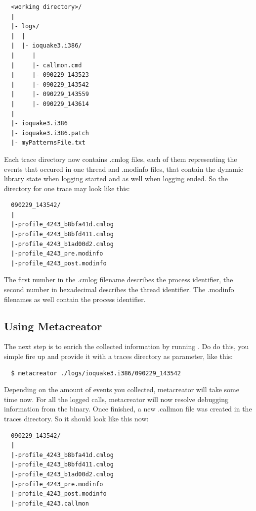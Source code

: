 \begin{verbatim}
  <working directory>/
  |
  |- logs/
  |  |
  |  |- ioquake3.i386/
  |     |
  |     |- callmon.cmd
  |     |- 090229_143523
  |     |- 090229_143542
  |     |- 090229_143559
  |     |- 090229_143614
  |
  |- ioquake3.i386
  |- ioquake3.i386.patch
  |- myPatternsFile.txt
\end{verbatim}

Each trace directory now contains .cmlog files, each of them representing the events that occured in one thread and .modinfo files, that contain the dynamic library state when logging started and as well when logging ended. So the directory for one trace may look like this: 

\begin{verbatim}
  090229_143542/
  |
  |-profile_4243_b8bfa41d.cmlog
  |-profile_4243_b8bfd411.cmlog
  |-profile_4243_b1ad00d2.cmlog
  |-profile_4243_pre.modinfo
  |-profile_4243_post.modinfo
\end{verbatim}

The first number in the .cmlog filename describes the process identifier, the second number in hexadecimal describes the thread identifier. The .modinfo filenames as well contain the process identifier.

\subsection{Using Metacreator}

The next step is to enrich the collected information by running . Do do this, you simple fire up  and provide it with a traces directory as parameter, like this:

\begin{verbatim}
  $ metacreator ./logs/ioquake3.i386/090229_143542
\end{verbatim}

Depending on the amount of events you collected, metacreator will take some time now. For all the logged calls, metacreator will now resolve debugging information from the binary. Once finished, a new .callmon file was created in the traces directory. So it should look like this now:

\begin{verbatim}
  090229_143542/
  |
  |-profile_4243_b8bfa41d.cmlog
  |-profile_4243_b8bfd411.cmlog
  |-profile_4243_b1ad00d2.cmlog
  |-profile_4243_pre.modinfo
  |-profile_4243_post.modinfo
  |-profile_4243.callmon
\end{verbatim}

